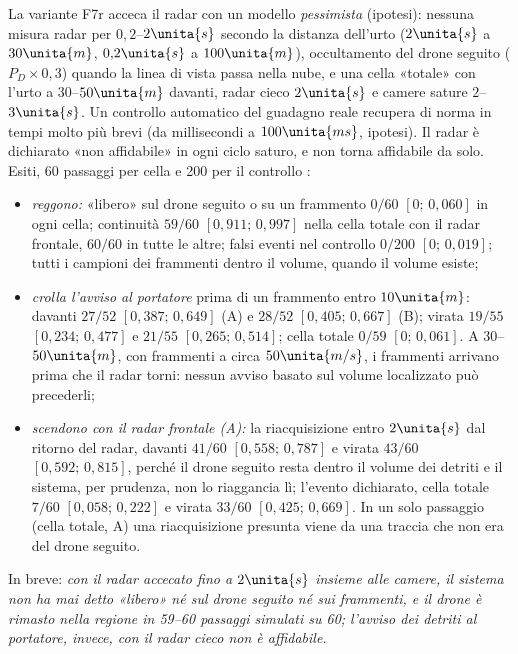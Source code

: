 La variante F7r acceca il radar con un modello \emph{pessimista} (ipotesi): nessuna misura radar per $0{,}2$--$2\unita{s}$ secondo la distanza dell'urto ($2\unita{s}$ a $30\unita{m}$, $0{,}2\unita{s}$ a $100\unita{m}$), occultamento del drone seguito ($P_D\times0{,}3$) quando la linea di vista passa nella nube, e una cella «totale» con l'urto a $30$--$50\unita{m}$ davanti, radar cieco $2\unita{s}$ e camere sature $2$--$3\unita{s}$. Un controllo automatico del guadagno reale recupera di norma in tempi molto più brevi (da millisecondi a $100\unita{ms}$, ipotesi). Il radar è dichiarato «non affidabile» in ogni ciclo saturo, e non torna affidabile da solo. Esiti, 60 passaggi per cella e 200 per il controllo :
\begin{itemize}
\item \emph{reggono:} «libero» sul drone seguito o su un frammento $0/60$ $[0;\,0{,}060]$ in ogni cella; continuità $59/60$ $[0{,}911;\,0{,}997]$ nella cella totale con il radar frontale, $60/60$ in tutte le altre; falsi eventi nel controllo $0/200$ $[0;\,0{,}019]$; tutti i campioni dei frammenti dentro il volume, quando il volume esiste;
\item \emph{crolla l'avviso al portatore} prima di un frammento entro $10\unita{m}$: davanti $27/52$ $[0{,}387;\,0{,}649]$ (A) e $28/52$ $[0{,}405;\,0{,}667]$ (B); virata $19/55$ $[0{,}234;\,0{,}477]$ e $21/55$ $[0{,}265;\,0{,}514]$; cella totale $0/59$ $[0;\,0{,}061]$. A $30$--$50\unita{m}$, con frammenti a circa $50\unita{m/s}$, i frammenti arrivano prima che il radar torni: nessun avviso basato sul volume localizzato può precederli;
\item \emph{scendono con il radar frontale (A):} la riacquisizione entro $2\unita{s}$ dal ritorno del radar, davanti $41/60$ $[0{,}558;\,0{,}787]$ e virata $43/60$ $[0{,}592;\,0{,}815]$, perché il drone seguito resta dentro il volume dei detriti e il sistema, per prudenza, non lo riaggancia lì; l'evento dichiarato, cella totale $7/60$ $[0{,}058;\,0{,}222]$ e virata $33/60$ $[0{,}425;\,0{,}669]$. In un solo passaggio (cella totale, A) una riacquisizione presunta viene da una traccia che non era del drone seguito.
\end{itemize}
In breve: \emph{con il radar accecato fino a $2\unita{s}$ insieme alle camere, il sistema non ha mai detto «libero» né sul drone seguito né sui frammenti, e il drone è rimasto nella regione in 59--60 passaggi simulati su 60; l'avviso dei detriti al portatore, invece, con il radar cieco non è affidabile.}

